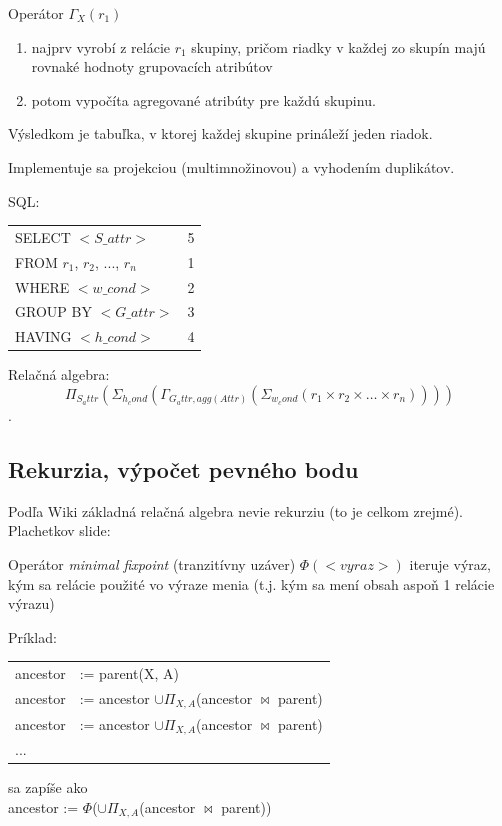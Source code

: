 \documentclass[10pt,a4paper]{article}
\begin{document}
Operátor $\Gamma_X(r_1)$
\begin{enumerate}
\item najprv vyrobí z relácie $r_1$ skupiny, pričom riadky v každej zo
skupín majú rovnaké hodnoty grupovacích atribútov
\item potom vypočíta agregované atribúty pre každú skupinu.
\end{enumerate}
Výsledkom je tabuľka, v ktorej každej skupine prináleží jeden
riadok.
 
Implementuje sa projekciou (multimnožinovou) a vyhodením duplikátov. 

SQL:
\begin{tabular}{lc}
SELECT $<S\_attr>$ & 5 \\
FROM $r_1$, $r_2$, ..., $r_n$ & 1 \\
WHERE $<w\_cond>$ & 2 \\
GROUP BY $<G\_attr>$ & 3 \\
HAVING $<h\_cond>$ & 4 \\
\end{tabular}

Relačná algebra: 
$$\Pi_{S_attr}(\Sigma_{h_cond}(\Gamma_{G_attr, agg(Attr)}(\Sigma_{w_cond}(r_1 \times r_2 \times \ldots \times r_n))))$$.


\subsection{Rekurzia, výpočet pevného bodu}

Podľa Wiki základná relačná algebra nevie rekurziu (to je celkom zrejmé). 
Plachetkov slide: 

Operátor \emph{minimal fixpoint} (tranzitívny uzáver) $\Phi(<vyraz>)$ iteruje výraz, kým sa relácie použité vo výraze
menia (t.j. kým sa mení obsah aspoň 1 relácie výrazu)

Príklad:
\begin{tabular}{ll}
ancestor &:= parent(X, A) \\
ancestor &:= ancestor $\cup \Pi_{X,A}$(ancestor $\Join$ parent) \\
ancestor &:= ancestor $\cup \Pi_{X,A}$(ancestor $\Join$ parent) \\
... & \\
\end{tabular}
sa zapíše ako\\
ancestor := $\Phi$($\cup \Pi_{X,A}$(ancestor $\Join$ parent)) \\
\end{document}
